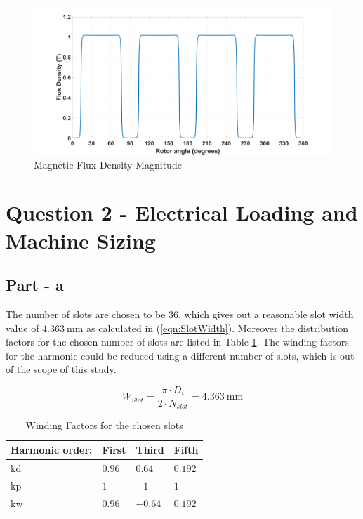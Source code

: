 \documentclass{article}
\begin{document}
\begin{figure}[h!]
\centering
\includegraphics[scale=0.15]{Figures/MagB.png}
\caption{Magnetic Flux Density Magnitude }
\label{fig:MagB}
\end{figure}

\section{Question 2 - Electrical Loading and Machine Sizing}
\subsection{Part - a}
The number of slots are chosen to be 36, which gives out a reasonable slot width value of $4.363 \: \mathrm{mm}$ as calculated in (\ref{eqn:SlotWidth}). Moreover the distribution factors for the chosen number of slots are listed in Table \ref{table:WindingFactor}. The winding factors for the harmonic could be reduced using a different number of slots, which is out of the scope of this study. 



\begin{equation} \label{eqn:SlotWidth}
    W_{Slot} = \frac{\pi \cdot D_i}{2 \cdot N_{slot}} =  4.363 \: \mathrm{mm}
\end{equation}
\begin{table}[h!] 
\begin{center}
\caption{Winding Factors for the chosen slots}
\label{table:WindingFactor}
\begin{tabular}{ |p{3cm}||p{3cm}|p{3cm}|p{3cm}|  }
 \hline
  Harmonic order: & First	& Third &Fifth\\
 \hline
 kd	& $0.96$	&	$0.64$ & $0.192$\\
 \hline
 kp &	$1$	& $-1$	&$1$\\
 \hline
 kw &$0.96$	& $-0.64$&	$0.192$\\
  \hline
 \end{tabular}
 \end{center}
 \end{table}
\end{document}
